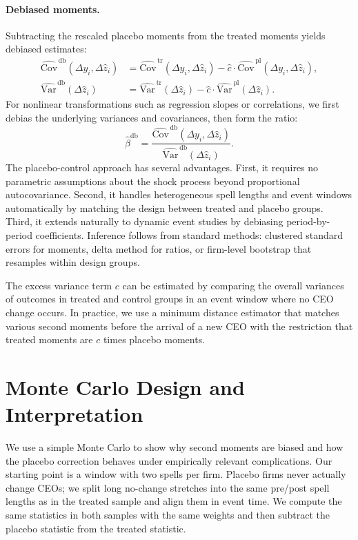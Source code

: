 \documentclass[11pt,a4paper]{article}
\newcommand{\Var}{\text{Var}}
\newcommand{\Cov}{\text{Cov}}
\begin{document}
\paragraph{Debiased moments.} Subtracting the rescaled placebo moments from the treated moments yields debiased estimates:
\begin{align}
\widehat{\Cov}^{\,\text{db}}(\Delta y_i,\Delta \hat z_i) &= \widehat{\Cov}^{\,\text{tr}}(\Delta y_i,\Delta \hat z_i) - \hat c\cdot\widehat{\Cov}^{\,\text{pl}}(\Delta y_i,\Delta \hat z_i),\\
\widehat{\Var}^{\,\text{db}}(\Delta \hat z_i) &= \widehat{\Var}^{\,\text{tr}}(\Delta \hat z_i) - \hat c\cdot\widehat{\Var}^{\,\text{pl}}(\Delta \hat z_i).
\end{align}
For nonlinear transformations such as regression slopes or correlations, we first debias the underlying variances and covariances, then form the ratio:
\begin{equation}
\hat\beta^{\text{db}} = \frac{\widehat{\Cov}^{\,\text{db}}(\Delta y_i,\Delta \hat z_i)}{\widehat{\Var}^{\,\text{db}}(\Delta \hat z_i)}.
\end{equation}
The placebo-control approach has several advantages. First, it requires no parametric assumptions about the shock process beyond proportional autocovariance. Second, it handles heterogeneous spell lengths and event windows automatically by matching the design between treated and placebo groups. Third, it extends naturally to dynamic event studies by debiasing period-by-period coefficients. Inference follows from standard methods: clustered standard errors for moments, delta method for ratios, or firm-level bootstrap that resamples within design groups.

The excess variance term $c$ can be estimated by comparing the overall variances of outcomes in treated and control groups in an event window where no CEO change occurs. In practice, we use a minimum distance estimator that matches various second moments before the arrival of a new CEO with the restriction that treated moments are $c$ times placebo moments. 

\section{Monte Carlo Design and Interpretation}

We use a simple Monte Carlo to show why second moments are biased and how the placebo correction behaves under empirically relevant complications. Our starting point is a window with two spells per firm. Placebo firms never actually change CEOs; we split long no-change stretches into the same pre/post spell lengths as in the treated sample and align them in event time. We compute the same statistics in both samples with the same weights and then subtract the placebo statistic from the treated statistic.
\end{document}
